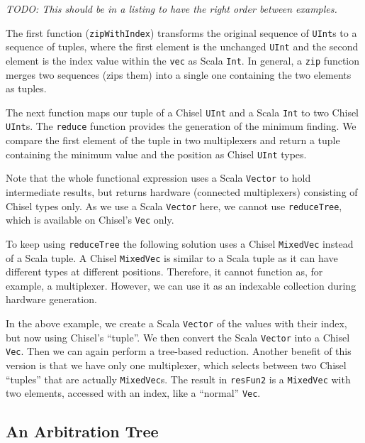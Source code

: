 \documentclass[%
    10pt,
    headinclude, footexclude,
    openright, %
    notitlepage,
    cleardoubleempty,
    headsepline,
    pointlessnumbers,
    bibtotoc, idxtotoc,
    ]{scrbook}
\newcommand{\code}[1]{{\lstinline[basicstyle=\small\ttfamily]{#1}}}
\newcommand{\todo}[1]{{\emph{TODO: #1}}}
\begin{document}
\todo{This should be in a listing to have the right order between examples.}


The first function (\code{zipWithIndex})
transforms the original sequence of \code{UInt}s to a sequence of tuples, where the first element is the
unchanged \code{UInt} and the second element is the index value within the \code{vec} as Scala \code{Int}.
In general, a \code{zip} function merges two sequences (zips them) into a single one
containing the two elements as tuples.

The next function maps our tuple of a Chisel \code{UInt}
and a Scala \code{Int} to two Chisel \code{UInt}s. The \code{reduce} function provides the generation of
the minimum finding. We compare the first element of the tuple in two multiplexers and return
a tuple containing the minimum value and the position as Chisel \code{UInt} types.


Note that the whole functional expression uses a Scala \code{Vector} to hold intermediate results,
but returns hardware (connected multiplexers) consisting of Chisel types only.
As we use a Scala \code{Vector} here, we cannot use \code{reduceTree}, which is available on Chisel's
\code{Vec} only.

To keep using \code{reduceTree} the following solution uses a Chisel \code{MixedVec}
instead of a Scala tuple.
A Chisel \code{MixedVec} is similar to a Scala tuple as it can have different types at different positions.
Therefore, it cannot function as, for example, a multiplexer. However, we can use it as an
indexable collection during hardware generation.



In the above example, we create a Scala \code{Vector} of the values with their index, but now
using Chisel's ``tuple''. We then convert the Scala \code{Vector} into a Chisel \code{Vec}.
Then we can again perform a tree-based reduction. Another benefit of this version is
that we have only one multiplexer, which selects between two Chisel ``tuples'' that are actually
\code{MixedVec}s.
The result in \code{resFun2} is a \code{MixedVec} with two elements,
accessed with an index, like a ``normal'' \code{Vec}.

\subsection{An Arbitration Tree}
\label{sec:arbiter}
\end{document}
